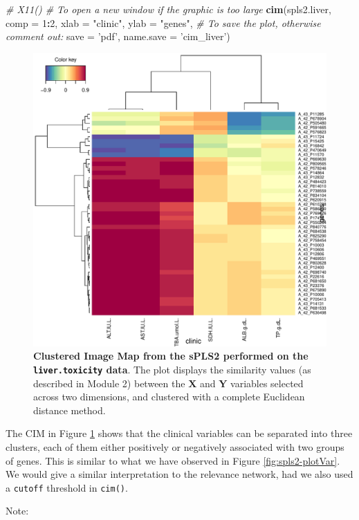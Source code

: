 \documentclass[]{book}
\newenvironment{Shaded}{\begin{snugshade}}{\end{snugshade}}
\newcommand{\CommentTok}[1]{\textcolor[rgb]{0.56,0.35,0.01}{\textit{#1}}}
\newcommand{\DataTypeTok}[1]{\textcolor[rgb]{0.13,0.29,0.53}{#1}}
\newcommand{\DecValTok}[1]{\textcolor[rgb]{0.00,0.00,0.81}{#1}}
\newcommand{\KeywordTok}[1]{\textcolor[rgb]{0.13,0.29,0.53}{\textbf{#1}}}
\newcommand{\NormalTok}[1]{#1}
\newcommand{\OperatorTok}[1]{\textcolor[rgb]{0.81,0.36,0.00}{\textbf{#1}}}
\newcommand{\StringTok}[1]{\textcolor[rgb]{0.31,0.60,0.02}{#1}}
\begin{document}
\begin{Shaded}
\begin{Highlighting}[]
\CommentTok{# X11()  # To open a new window if the graphic is too large}
\KeywordTok{cim}\NormalTok{(spls2.liver, }\DataTypeTok{comp =} \DecValTok{1}\OperatorTok{:}\DecValTok{2}\NormalTok{, }\DataTypeTok{xlab =} \StringTok{"clinic"}\NormalTok{, }\DataTypeTok{ylab =} \StringTok{"genes"}\NormalTok{,}
    \CommentTok{# To save the plot, otherwise comment out:}
    \DataTypeTok{save =} \StringTok{'pdf'}\NormalTok{, }\DataTypeTok{name.save =} \StringTok{'cim_liver'}\NormalTok{)}
\end{Highlighting}
\end{Shaded}

\begin{figure}

{\centering \includegraphics[width=0.5\linewidth]{cim_liver} 

}

\caption{\textbf{Clustered Image Map from the sPLS2 performed on the \texttt{liver.toxicity} data}. The plot displays the similarity values (as described in Module 2) between the \(\boldsymbol X\) and \(\boldsymbol Y\) variables selected across two dimensions, and clustered with a complete Euclidean distance method.}\label{fig:spls2-cim}
\end{figure}



The CIM in Figure \ref{fig:spls2-cim} shows that the clinical variables can be separated into three clusters, each of them either positively or negatively associated with two groups of genes. This is similar to what we have observed in Figure \ref{fig:spls2-plotVar}. We would give a similar interpretation to the relevance network, had we also used a \texttt{cutoff} threshold in \texttt{cim()}.

Note:
\end{document}
